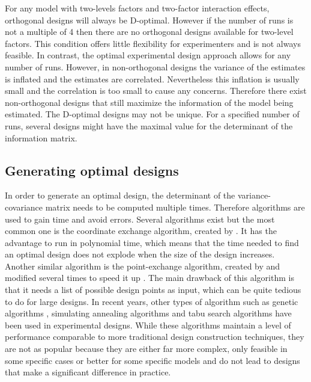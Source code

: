 For any model with two-levels factors and two-factor interaction effects, orthogonal designs will always be D-optimal. 
However if the number of runs is not a multiple of 4 then there are no orthogonal designs available for two-level factors. 
This condition offers little flexibility for experimenters and is not always feasible. 
In contrast, the optimal experimental design approach allows for any number of runs. 
However, in non-orthogonal designs the variance of the estimates is inflated and the estimates are correlated. 
Nevertheless this inflation is usually small and the correlation is too small to cause any concerns.
Therefore there exist non-orthogonal designs that still maximize the information of the model being estimated.
The D-optimal designs may not be unique. For a specified number of runs,
 several designs might have the maximal value for the determinant of the information matrix.\\


\subsection{Generating optimal designs}
In order to generate an optimal design, the determinant of the variance-covariance matrix needs to be computed 
multiple times. 
Therefore algorithms are used to gain time and avoid errors. 
Several algorithms exist but the most common one is 
the coordinate exchange algorithm, created by \textcite{meyer_coordinate-exchange_1995}. 
It has the advantage to run in polynomial time, which means that the time needed to find an optimal design does not explode when 
the size of the design increases. 
Another similar algorithm is the point-exchange algorithm, created by \textcite{fedorov_theory_1972} and modified several times to speed 
it up \parencite{johnson_guidelines_1983,atkinson_construction_1989}. The main drawback of this algorithm is that it needs a list of 
possible design points as input, which can be quite tedious to do for large designs. In recent years, other types of algorithm 
such as genetic algorithms \parencite{heredia-langner_genetic_2003,heredia-langner_model-robust_2004}, simulating annealing algorithms 
\parencite{bohachevsky_generalized_1986,meyer_constructing_1988} and tabu search algorithms \parencite{jung_construction_1996} have 
been used in experimental designs. While these algorithms maintain a level of performance comparable to more traditional design 
construction techniques, they are not as popular because they are either far more complex, only feasible in some specific cases 
or better for some specific models and do not lead to designs that make a significant difference in practice.


